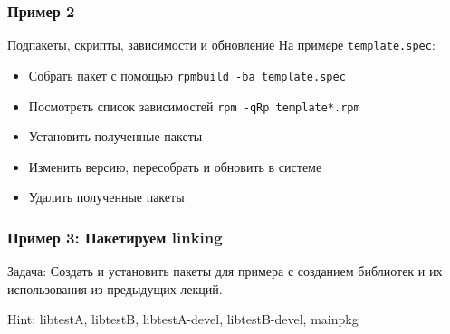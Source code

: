 \begin{frame}
	\frametitle{Пример 2}

	\begin{block}{Подпакеты, скрипты, зависимости и обновление}
		На примере {\tt template.spec}:

		\begin{itemize}
			\item Собрать пакет с помощью {\tt rpmbuild -ba template.spec}
			\item Посмотреть список зависимостей {\tt rpm -qRp template*.rpm}
			\item Установить полученные пакеты
			\item Изменить версию, пересобрать и обновить в системе
			\item Удалить полученные пакеты
		\end{itemize}
	\end{block}
\end{frame}

\begin{frame}
	\frametitle{Пример 3: Пакетируем linking}

	\begin{block}{Задача:}
		Создать и установить пакеты для примера с созданием библиотек
		и их использования из предыдущих лекций.
	\end{block}

	Hint: libtestA, libtestB, libtestA-devel, libtestB-devel, mainpkg

\end{frame}

